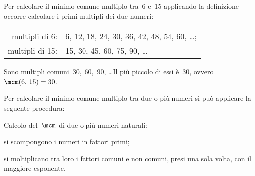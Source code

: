 Per calcolare il minimo comune multiplo tra~6 e~15 applicando la definizione occorre calcolare i primi
multipli dei due numeri:
\begin{center}
\begin{tabular}{rl}
multipli di 6: & 6, 12, 18, 24, 30, 36, 42, 48, 54, 60, \ldots;\\
multipli di 15: & 15, 30, 45, 60, 75, 90, \ldots\\
\end{tabular}
\end{center}
Sono multipli comuni~30,~60,~90, \ldots Il più piccolo di essi è~30, ovvero $\mcm(6\text{,~}15)=30$.

Per calcolare il minimo comune multiplo tra due o più numeri si può applicare la seguente procedura:
\begin{procedura}
Calcolo del~$\mcm$ di due o più numeri naturali:
\begin{enumeratea}
 \item si scompongono i numeri in fattori primi;
 \item si moltiplicano tra loro i fattori comuni e non comuni, presi una sola volta, con il maggiore
esponente.
\end{enumeratea}
\end{procedura}

